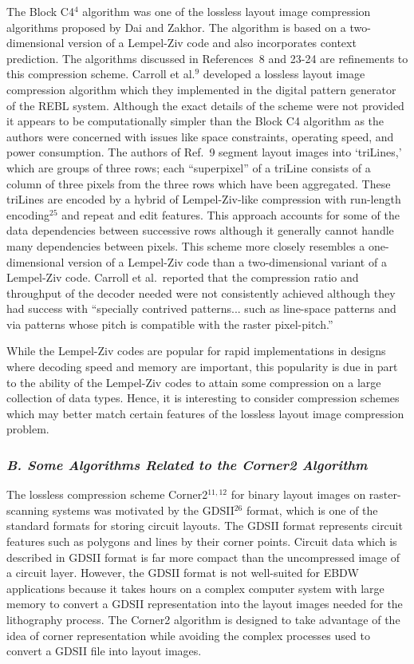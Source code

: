 \documentclass{article}
\begin{document}
The Block C4$^4$ algorithm was one of the lossless layout image compression
algorithms proposed by Dai and Zakhor.  The algorithm is based on a 
two-dimensional version of a Lempel-Ziv code and also incorporates context 
prediction.  The algorithms discussed in References~8 and 23-24 are
refinements to this compression scheme.
Carroll et al.$^9$ developed a lossless layout image compression algorithm
which they implemented in the digital pattern generator of the REBL system.
Although the exact details of the scheme were not provided 
it appears to be computationally simpler than the Block C4 algorithm
as the authors were concerned with issues like
space constraints, operating speed, and power consumption.  
The authors of Ref.~9 segment layout images into `triLines,' which are groups
of three rows; each ``superpixel'' of a triLine consists of
a column of three pixels from the three rows which have been aggregated.
These triLines are encoded by a hybrid of Lempel-Ziv-like compression 
with run-length encoding$^{25}$ and repeat and edit features.  
This approach accounts for
some of the data dependencies between successive rows although
it generally cannot handle many dependencies between 
pixels.  This scheme more closely resembles a one-dimensional version of a
Lempel-Ziv code than a two-dimensional variant of a Lempel-Ziv code.  
Carroll et al.~reported that the compression ratio and throughput of
the decoder needed were not consistently achieved although they had success
with ``specially contrived patterns... such as line-space patterns and via
patterns whose pitch is compatible with the raster pixel-pitch.'' 

While the Lempel-Ziv codes are popular for rapid implementations in designs 
where decoding speed and memory are important, this popularity is due in part
to the ability of the Lempel-Ziv codes to attain some compression on a large 
collection of data types.  Hence, it is interesting to consider 
compression schemes which may better match certain features of the lossless
layout image compression problem.

\subsubsection*{{\em B. Some Algorithms Related to the Corner2 Algorithm}}

The lossless compression scheme Corner2$^{11,12}$ 
for binary layout images on  raster-scanning systems
was motivated by the GDSII$^{26}$ format, which is one of the standard formats
for storing circuit layouts.  The GDSII format represents circuit features
such as polygons and lines by their corner points.
Circuit data which is described in GDSII format is far more compact than
the uncompressed image of a circuit layer. 
However, the GDSII format is not well-suited for EBDW applications because
it takes hours on a complex computer system with large memory to convert
a GDSII representation into the layout images needed for the lithography
process.  The Corner2 algorithm is designed to take advantage of the idea
of corner representation while avoiding the complex processes used to convert
a GDSII file into layout images. 
\end{document}
